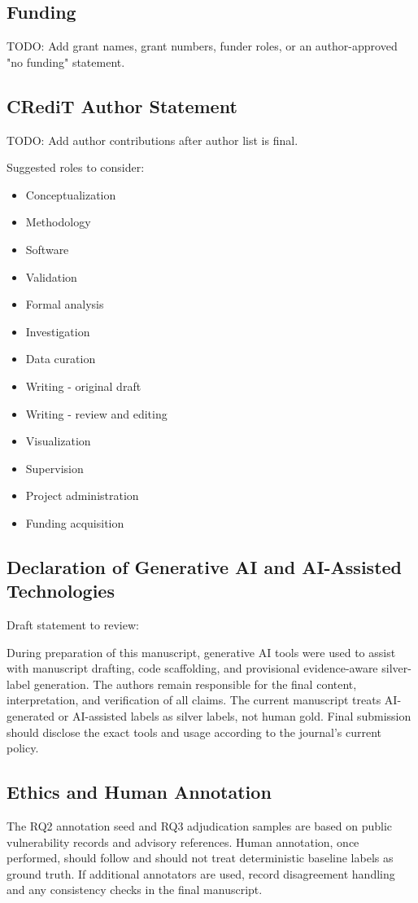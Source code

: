 \subsection{Funding}

TODO: Add grant names, grant numbers, funder roles, or an author-approved "no funding" statement.

\subsection{CRediT Author Statement}

TODO: Add author contributions after author list is final.

Suggested roles to consider:

\begin{itemize}
\item Conceptualization
\item Methodology
\item Software
\item Validation
\item Formal analysis
\item Investigation
\item Data curation
\item Writing - original draft
\item Writing - review and editing
\item Visualization
\item Supervision
\item Project administration
\item Funding acquisition
\end{itemize}

\subsection{Declaration of Generative AI and AI-Assisted Technologies}

Draft statement to review:

During preparation of this manuscript, generative AI tools were used to assist with manuscript drafting, code scaffolding, and provisional evidence-aware silver-label generation. The authors remain responsible for the final content, interpretation, and verification of all claims. The current manuscript treats AI-generated or AI-assisted labels as silver labels, not human gold. Final submission should disclose the exact tools and usage according to the journal's current policy.

\subsection{Ethics and Human Annotation}

The RQ2 annotation seed and RQ3 adjudication samples are based on public vulnerability records and advisory references. Human annotation, once performed, should follow  and should not treat deterministic baseline labels as ground truth. If additional annotators are used, record disagreement handling and any consistency checks in the final manuscript.

